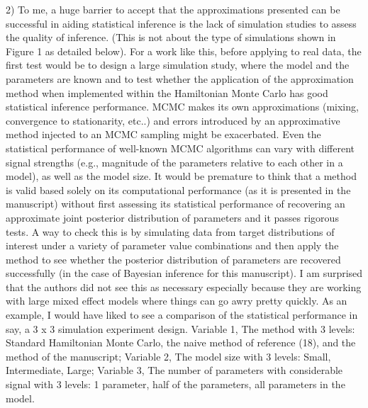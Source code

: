 \documentclass[12pt]{article}
\begin{document}
2) To me, a huge barrier to accept that the approximations presented can be successful in aiding statistical inference is the lack of simulation studies to assess the quality of inference. (This is not about the type of simulations shown in Figure 1 as detailed below). For a work like this, before applying to real data, the first test would be to design a large simulation study, where the model and the parameters are known and to test whether the application of the approximation method when implemented within the Hamiltonian Monte Carlo has good statistical inference performance. MCMC makes its own approximations (mixing, convergence to stationarity, etc..) and errors introduced by an approximative method injected to an MCMC sampling might be exacerbated. Even the statistical performance of well-known MCMC algorithms can vary with different signal strengths (e.g., magnitude of the parameters relative to each other in a model), as well as the model size. It would be premature to think that a method is valid based solely on its computational performance (as it is presented in the manuscript) without first assessing its statistical performance of recovering an approximate joint posterior distribution of parameters and it passes rigorous tests. A way to check this is by simulating data from target distributions of interest under a variety of parameter value combinations and then apply the method to see whether the posterior distribution of parameters are recovered successfully (in the case of Bayesian inference for this manuscript). I am surprised that the authors did not see this as necessary especially because they are working with large mixed effect models where things can go awry pretty quickly. As an example, I would have liked to see a comparison of the statistical performance in say, a 3 x 3 simulation experiment design. Variable 1, The method with 3 levels: Standard Hamiltonian Monte Carlo, the naive method of reference (18), and the method of the manuscript; Variable 2, The model size with 3 levels: Small, Intermediate, Large; Variable 3, The number of parameters with considerable signal with 3 levels: 1 parameter, half of the parameters, all parameters in the model. 
\end{document}

